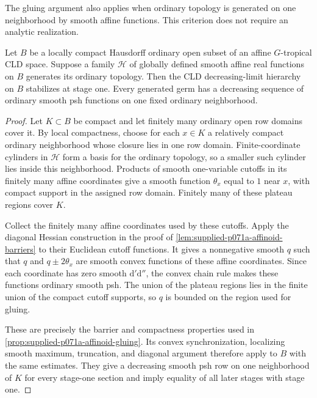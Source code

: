 The gluing argument also applies when ordinary topology is generated on one neighborhood by smooth affine functions. This criterion does not require an analytic realization.

\begin{proposition}
\label{prop:supplied-p071a-affine-coordinate-criterion}
Let $B$ be a locally compact Hausdorff ordinary open subset of an affine $G$-tropical CLD space. Suppose a family $\mathscr{H}$ of globally defined smooth affine real functions on $B$ generates its ordinary topology. Then the CLD decreasing-limit hierarchy on $B$ stabilizes at stage one. Every generated germ has a decreasing sequence of ordinary smooth psh functions on one fixed ordinary neighborhood.
\end{proposition}

\begin{proof}
Let $K\subset B$ be compact and let finitely many ordinary open row domains cover it. By local compactness, choose for each $x\in K$ a relatively compact ordinary neighborhood whose closure lies in one row domain. Finite-coordinate cylinders in $\mathscr{H}$ form a basis for the ordinary topology, so a smaller such cylinder lies inside this neighborhood. Products of smooth one-variable cutoffs in its finitely many affine coordinates give a smooth function $\theta_x$ equal to $1$ near $x$, with compact support in the assigned row domain. Finitely many of these plateau regions cover $K$.

Collect the finitely many affine coordinates used by these cutoffs. Apply the diagonal Hessian construction in the proof of \cref{lem:supplied-p071a-affinoid-barriers} to their Euclidean cutoff functions. It gives a nonnegative smooth $q$ such that $q$ and $q\pm2\theta_x$ are smooth convex functions of these affine coordinates. Since each coordinate has zero smooth $\mathrm{d}'\mathrm{d}''$, the convex chain rule makes these functions ordinary smooth psh. The union of the plateau regions lies in the finite union of the compact cutoff supports, so $q$ is bounded on the region used for gluing.

These are precisely the barrier and compactness properties used in \cref{prop:supplied-p071a-affinoid-gluing}. Its convex synchronization, localizing smooth maximum, truncation, and diagonal argument therefore apply to $B$ with the same estimates. They give a decreasing smooth psh row on one neighborhood of $K$ for every stage-one section and imply equality of all later stages with stage one.
\end{proof}

